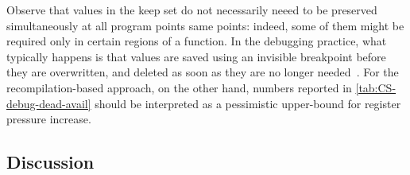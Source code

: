 Observe that values in the keep set do not necessarily neeed to be preserved simultaneously at all program points same points: indeed, some of them might be required only in certain regions of a function. In the debugging practice, what typically happens is that values are saved using an invisible breakpoint before they are overwritten, and deleted as soon as they are no longer needed~\cite{Jaramillo00}. For the recompilation-based approach, on the other hand, numbers reported in \mytable\ref{tab:CS-debug-dead-avail} should be interpreted as a pessimistic upper-bound for register pressure increase.

\subsection{Discussion}


